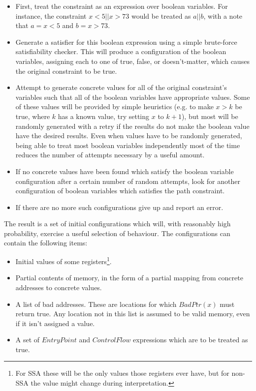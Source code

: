 \begin{itemize}
\item First, treat the constraint as an expression over boolean
  variables.  For instance, the constraint $x < 5 || x > 73$ would be
  treated as $a || b$, with a note that $a = x < 5$ and $b = x > 73$.
\item Generate a satisfier for this boolean expression using a simple
  brute-force satisfiability checker.  This will produce a
  configuration of the boolean variables, assigning each to one of
  true, false, or doesn't-matter, which causes the original constraint
  to be true.
\item Attempt to generate concrete values for all of the original
  constraint's variables such that all of the boolean variables have
  appropriate values.  Some of these values will be provided by simple
  heuristics (e.g. to make $x > k$ be true, where $k$ has a known
  value, try setting $x$ to $k+1$), but most will be randomly
  generated with a retry if the results do not make the boolean value
  have the desired results.  Even when values have to be randomly
  generated, being able to treat most boolean variables independently
  most of the time reduces the number of attempts necessary by a
  useful amount.
\item If no concrete values have been found which satisfy the boolean
  variable configuration after a certain number of random attempts,
  look for another configuration of boolean variables which satisfies
  the path constraint.
\item If there are no more such configurations give up and report an
  error.
\end{itemize}

The result is a set of initial configurations which will, with
reasonably high probability, exercise a useful selection of
\StateMachine behaviour.  The configurations can contain the following
items:

\begin{itemize}
\item Initial values of some registers\footnote{For SSA {\StateMachines}
  these will be the only values those registers ever have, but for
  non-SSA {\StateMachines} the value might change during
  interpretation.}.
\item Partial contents of memory, in the form of a partial mapping
  from concrete addresses to concrete values.
\item A list of bad addresses.  These are locations for which
  $BadPtr(x)$ must return true.  Any location not in this list is
  assumed to be valid memory, even if it isn't assigned a value.
\item A set of $EntryPoint$ and $ControlFlow$ expressions which
  are to be treated as true.
\end{itemize}

